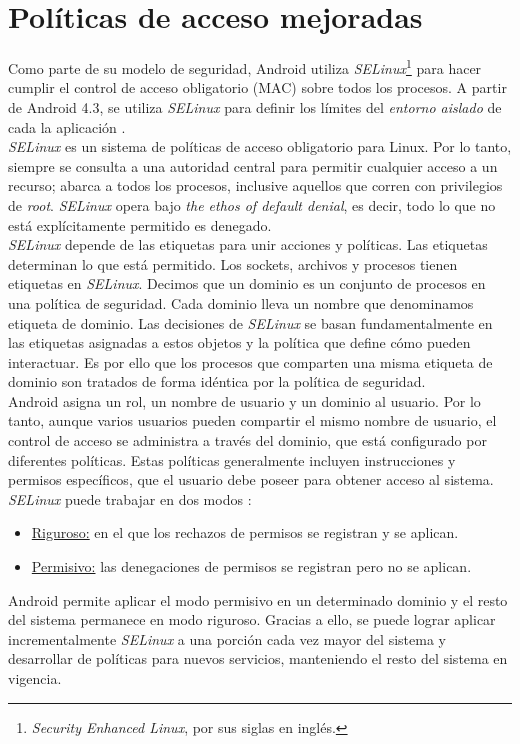 \section{Políticas de acceso mejoradas}
Como parte de su modelo de seguridad, Android utiliza \emph{SELinux}\footnote{\textit{Security Enhanced Linux}, por sus siglas en inglés.} para hacer cumplir el control de acceso obligatorio (MAC) sobre todos los procesos. A partir de Android 4.3, se utiliza \emph{SELinux} para definir los límites del \emph{entorno aislado} de cada la aplicación \cite{aosel}.\\

\emph{SELinux} es un sistema de políticas de acceso obligatorio para Linux. Por lo tanto, siempre se consulta a una autoridad central para permitir cualquier acceso a un recurso; abarca a todos los procesos, inclusive aquellos que corren con privilegios de \textit{root}. \emph{SELinux} opera bajo \textit{the ethos of default denial}, es decir, todo lo que no está explícitamente permitido es denegado.\\

\emph{SELinux} depende de las etiquetas para unir acciones y políticas. Las etiquetas determinan lo que está permitido. Los sockets, archivos y procesos tienen etiquetas en \emph{SELinux}. Decimos que un dominio es un conjunto de procesos en una política de seguridad. Cada dominio lleva un nombre que denominamos etiqueta de dominio.  Las decisiones de \emph{SELinux} se basan fundamentalmente en las etiquetas asignadas a estos objetos y la política que define cómo pueden interactuar. Es por ello que los procesos que comparten una misma etiqueta de dominio son tratados de forma idéntica por la política de seguridad.\\

Android asigna un rol, un nombre de usuario y un dominio al usuario. Por lo tanto, aunque varios usuarios pueden compartir el mismo nombre de usuario, el control de acceso se administra a través del dominio, que está configurado por diferentes políticas. Estas políticas generalmente incluyen instrucciones y permisos específicos, que el usuario debe poseer para obtener acceso al sistema.\\

\emph{SELinux} puede trabajar en dos modos \cite{aosel}:
\begin{itemize}
    \item \underline{Riguroso:} en el que los rechazos de permisos se registran y se aplican.
    \item \underline{Permisivo:} las denegaciones de permisos se registran pero no se aplican.
\end{itemize} 
Android permite aplicar el modo permisivo en un determinado dominio y el resto del sistema permanece en modo riguroso. Gracias a ello, se puede lograr aplicar incrementalmente \emph{SELinux} a una porción cada vez mayor del sistema y desarrollar de políticas para nuevos servicios, manteniendo el resto del sistema en vigencia.
